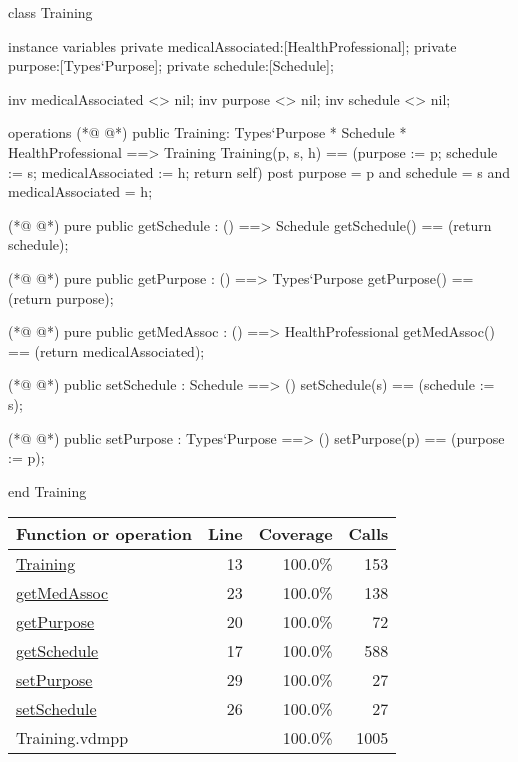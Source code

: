 \begin{vdmpp}[breaklines=true]
class Training
 
instance variables
 private medicalAssociated:[HealthProfessional];
 private purpose:[Types`Purpose];
 private schedule:[Schedule];

 inv medicalAssociated <> nil;
 inv purpose <> nil;
 inv schedule <> nil;

operations
(*@
\label{Training:13}
@*)
 public Training: Types`Purpose * Schedule * HealthProfessional ==> Training
   Training(p, s, h) == (purpose := p; schedule := s; medicalAssociated := h; return self)
 post purpose = p and schedule = s and medicalAssociated = h;

(*@
\label{getSchedule:17}
@*)
 pure public getSchedule : () ==> Schedule
   getSchedule() == (return schedule);
 
(*@
\label{getPurpose:20}
@*)
  pure public getPurpose : () ==> Types`Purpose
  getPurpose() == (return purpose); 
 
(*@
\label{getMedAssoc:23}
@*)
 pure public getMedAssoc : () ==> HealthProfessional
  getMedAssoc() == (return medicalAssociated); 

(*@
\label{setSchedule:26}
@*)
 public setSchedule : Schedule ==> ()
   setSchedule(s) == (schedule := s);
 
(*@
\label{setPurpose:29}
@*)
 public setPurpose : Types`Purpose ==> ()
   setPurpose(p) == (purpose := p);
 
 end Training
\end{vdmpp}
\bigskip
\begin{longtable}{|l|r|r|r|}
\hline
Function or operation & Line & Coverage & Calls \\
\hline
\hline
\hyperref[Training:13]{Training} & 13&100.0\% & 153 \\
\hline
\hyperref[getMedAssoc:23]{getMedAssoc} & 23&100.0\% & 138 \\
\hline
\hyperref[getPurpose:20]{getPurpose} & 20&100.0\% & 72 \\
\hline
\hyperref[getSchedule:17]{getSchedule} & 17&100.0\% & 588 \\
\hline
\hyperref[setPurpose:29]{setPurpose} & 29&100.0\% & 27 \\
\hline
\hyperref[setSchedule:26]{setSchedule} & 26&100.0\% & 27 \\
\hline
\hline
Training.vdmpp & & 100.0\% & 1005 \\
\hline
\end{longtable}

